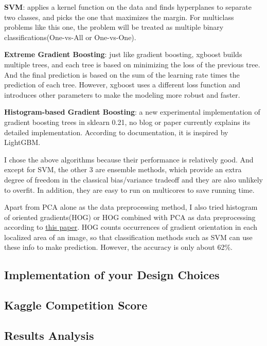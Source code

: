 \documentclass[12pt]{article}
\begin{document}
\textbf{SVM}: applies a kernel function on the data and finds hyperplanes to separate two classes, and picks the one that maximizes the margin. For multiclass problems like this one, the problem will be treated as multiple binary classifications(One-vs-All or One-vs-One).

\textbf{Extreme Gradient Boosting}: just like gradient boosting, xgboost builds multiple trees, and each tree is based on minimizing the loss of the previous tree. And the final prediction is based on the sum of the learning rate times the prediction of each tree. However, xgboost uses a different loss function and introduces other parameters to make the modeling more robust and faster.

\textbf{Histogram-based Gradient Boosting}: a new experimental implementation of gradient boosting trees in sklearn 0.21, no blog or paper currently explains its detailed implementation. According to documentation, it is inspired by LightGBM.

I chose the above algorithms because their performance is relatively good. And except for SVM, the other 3 are ensemble methods, which provide an extra degree of freedom in the classical bias/variance tradeoff and they are also unlikely to overfit. In addition, they are easy to run on multicores to save running time.

Apart from PCA alone as the data preprocessing method, I also tried histogram of oriented gradients(HOG) or HOG combined with PCA as data preprocessing according to \href{https://www.ijitee.org/wp-content/uploads/papers/v8i5/E3075038519.pdf}{this paper}. HOG counts occurrences of gradient orientation in each localized area of an image, so that classification methods such as SVM can use these info to make prediction. However, the accuracy is only about 62\%.

\subsection{Implementation of your Design Choices}

\subsection{Kaggle Competition Score}

\subsection{Results Analysis}
\end{document}
